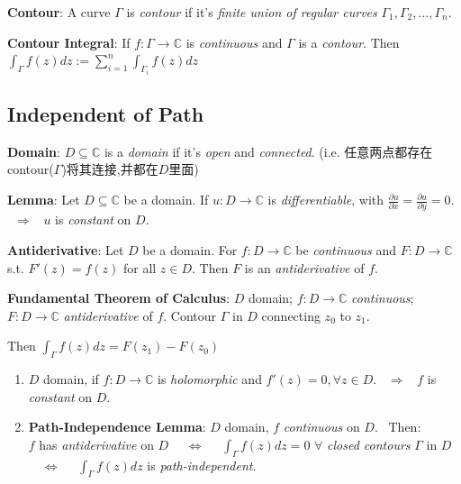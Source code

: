 \documentclass[9pt]{article}
\begin{document}
\textbf{Contour}: A curve $\Gamma$ is \textit{contour} if it's \textit{finite union of regular curves} $\Gamma_1,\Gamma_2,...,\Gamma_n$. \quad {}

\quad \textbf{Contour Integral}: If $f:\Gamma\to\mathbb{C}$ is \textit{continuous} and $\Gamma$ is a \textit{contour}. Then $\int_{\Gamma}f(z)dz:=\sum^n_{i=1}\int_{\Gamma_i}f(z)dz$


\subsection{Independent of Path} %

\textbf{Domain}: $D\subseteq\mathbb{C}$ is a \textit{domain} if it's \textit{open} and \textit{connected}. {\small (i.e. 任意两点都存在contour($\Gamma$)将其连接,并都在$D$里面)}

\textbf{Lemma}: Let $D\subseteq\mathbb{C}$ be a domain. If $u:D\to\mathbb{C}$ is \textit{differentiable}, with $\frac{\partial u}{\partial x}=\frac{\partial u}{\partial y}=0$. \ $\Rightarrow$ \ $u$ is \textit{constant} on $D$. \qquad {}

\textbf{Antiderivative}: {\small Let $D$ be a domain. For $f:D\to\mathbb{C}$ be \textit{continuous} and $F:D\to\mathbb{C}$ s.t. $F'(z)=f(z)$ for all $z\in D$. Then $F$ is an \textit{antiderivative} of $f$.}

\textbf{Fundamental Theorem of Calculus}: {\small $D$ domain; $f:D\to\mathbb{C}$ \textit{continuous}; $F:D\to\mathbb{C}$ \textit{antiderivative} of $f$. Contour $\Gamma$ in $D$ connecting $z_0$ to $z_1$.}

\hspace{160pt} Then $\int_{\Gamma}f(z)dz = F(z_1)-F(z_0)$

\begin{enumerate}[itemsep=-2pt, topsep=-2pt]
    \item $D$ domain, if $f:D\to\mathbb{C}$ is \textit{holomorphic} and $f'(z)=0,\forall z\in D$. \ $\Rightarrow$ \ $f$ is \textit{constant} on $D$.
    \item \textbf{Path-Independence Lemma}: $D$ domain, $f$ \textit{continuous} on $D$. \ Then: \\
    $f$ has \textit{antiderivative} on $D$ \ \ $\Leftrightarrow$ \ \ $\int_{\Gamma}f(z)dz=0$ $\forall$ \textit{closed contours} $\Gamma$ in $D$ \ \ $\Leftrightarrow$ \ \ $\int_{\Gamma}f(z)dz$ is \textit{path-independent}.
\end{enumerate}
\end{document}
